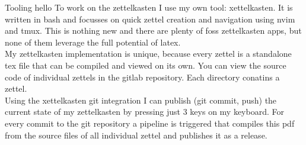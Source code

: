 \documentclass[class=article, crop=false]{standalone}
\begin{document}
\begin{zettel}{Tooling}
    hello
    To work on the zettelkasten I use my own tool: xettelkasten. It is written in bash and focusses on quick zettel creation and navigation using nvim and tmux. This is nothing new and there are plenty of foss zettelkasten apps, but none of them leverage the full potential of latex.\\

    My zettelkasten implementation is unique, because every zettel is a standalone tex file that can be compiled and viewed on its own. You can view the source code of individual zettels in the gitlab repository. Each directory conatins a zettel.\\

    Using the xettelkasten git integration I can publish (git commit, push) the current state of my zettelkasten by pressing just 3 keys on my keyboard. For every commit to the git repository a pipeline is triggered that compiles this pdf from the source files of all individual zettel and publishes it as a release.
\end{zettel}
\end{document}
